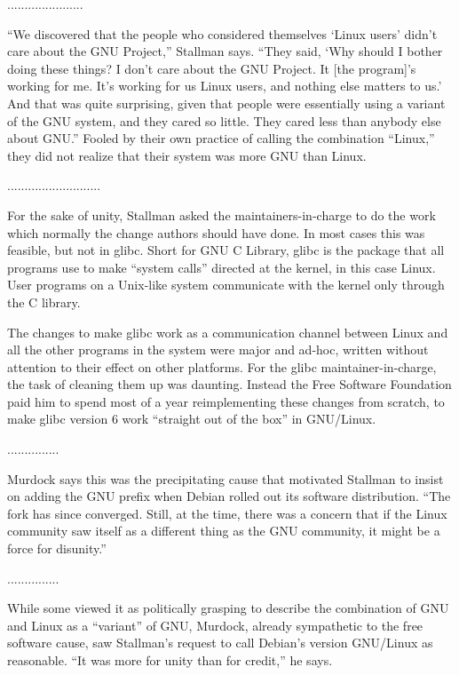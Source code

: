 \ifdefined\chs
......................
\fi

\ifdefined\eng
``We discovered that the people who considered themselves `Linux users' didn't care about the GNU Project,'' Stallman says. ``They said, `Why should I bother doing these things? I don't care about the GNU Project. It [the program]'s working for me. It's working for us Linux users, and nothing else matters to us.' And that was quite surprising, given that people were essentially using a variant of the GNU system, and they cared so little. They cared less than anybody else about GNU.''  Fooled by their own practice of calling the combination ``Linux,'' they did not realize that their system was more GNU than Linux.
\fi

\ifdefined\chs
...........................
\fi

\ifdefined\eng
For the sake of unity, Stallman asked the maintainers-in-charge to do the work which normally the change authors should have done.  In most cases this was feasible, but not in glibc. Short for GNU C Library, glibc is the package that all programs use to make ``system calls'' directed at the kernel, in this case Linux.  User programs on a Unix-like system communicate with the kernel only through the C library.
\fi

\ifdefined\chs

\fi

\ifdefined\eng
The changes to make glibc work as a communication channel between Linux and all the other programs in the system were major and ad-hoc, written without attention to their effect on other platforms.  For the glibc maintainer-in-charge, the task of cleaning them up was daunting. Instead the Free Software Foundation paid him to spend most of a year reimplementing these changes from scratch, to make glibc version 6 work ``straight out of the box'' in GNU/Linux.
\fi

\ifdefined\chs
...............
\fi

\ifdefined\eng
Murdock says this was the precipitating cause that motivated Stallman to insist on adding the GNU prefix when Debian rolled out its software distribution. ``The fork has since converged. Still, at the time, there was a concern that if the Linux community saw itself as a different thing as the GNU community, it might be a force for disunity.''
\fi

\ifdefined\chs
...............
\fi

\ifdefined\eng
While some viewed it as politically grasping to describe the combination of GNU and Linux as a ``variant'' of GNU, Murdock, already sympathetic to the free software cause, saw Stallman's request to call Debian's version GNU/Linux as reasonable. ``It was more for unity than for credit,'' he says.
\fi

